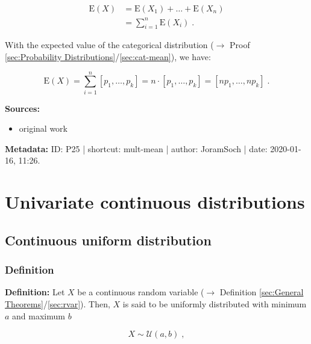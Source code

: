 \documentclass[a4paper,12pt,twoside]{book}
\begin{document}
\begin{equation} \label{eq:mult-mean-mult-mean-s2}
\begin{split}
\mathrm{E}(X) &= \mathrm{E}(X_1) + \ldots + \mathrm{E}(X_n) \\
&= \sum_{i=1}^{n} \mathrm{E}(X_i) \; .
\end{split}
\end{equation}

With the expected value of the categorical distribution ($\rightarrow$ Proof \ref{sec:Probability Distributions}/\ref{sec:cat-mean}), we have:

\begin{equation} \label{eq:mult-mean-mult-mean-s3}
\mathrm{E}(X) = \sum_{i=1}^{n} \left[p_1, \ldots, p_k \right] = n \cdot \left[p_1, \ldots, p_k \right] = \left[n p_1, \ldots, n p_k \right] \; .
\end{equation}


\vspace{1em}
\textbf{Sources:}
\begin{itemize}
\item original work\end{itemize}


\vspace{1em}
\textbf{Metadata:} ID: P25 | shortcut: mult-mean | author: JoramSoch | date: 2020-01-16, 11:26.
\vspace{1em}



\pagebreak
\section{Univariate continuous distributions}

\subsection{Continuous uniform distribution}

\subsubsection[\textit{Definition}]{Definition} \label{sec:cuni}
\setcounter{equation}{0}

\textbf{Definition:} Let $X$ be a continuous random variable ($\rightarrow$ Definition \ref{sec:General Theorems}/\ref{sec:rvar}). Then, $X$ is said to be uniformly distributed with minimum $a$ and maximum $b$

\begin{equation} \label{eq:cuni-cuni}
X \sim \mathcal{U}(a, b) \; ,
\end{equation}
\end{document}

